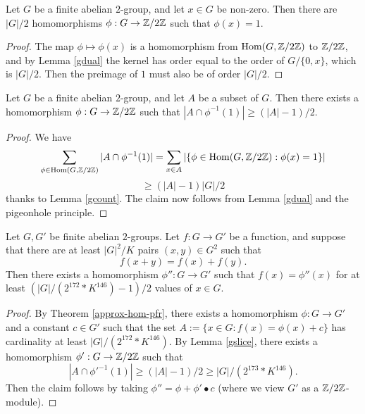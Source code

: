 \begin{lemma}[Counting]\label{gcount}\leanok Let $G$ be a finite abelian $2$-group, and let $x \in G$ be non-zero.  Then there are $|G|/2$ homomorphisms $\phi: G \to \mathbb{Z}/2\mathbb{Z}$ such that $\phi(x) = 1$.
\end{lemma}

\begin{proof} \leanok The map $\phi \mapsto \phi(x)$ is a homomorphism from $\mathrm{Hom}(G,\mathbb{Z}/2\mathbb{Z})$ to $\mathbb{Z}/2\mathbb{Z}$, and by Lemma \ref{gdual} the kernel has order equal to the order of $G / \{0,x\}$, which is $|G|/2$.  Then the preimage of $1$ must also be of order $|G|/2$.
\end{proof}

\begin{lemma}[Slicing]\label{gslice}\leanok  Let $G$ be a finite abelian $2$-group, and let $A$ be a subset of $G$.  Then there exists a homomorphism $\phi: G \to \mathbb{Z}/2\mathbb{Z}$ such that $|A \cap \phi^{-1}(1)| \geq (|A|-1)/2$.
\end{lemma}

\begin{proof}\leanok  We have
  $$ \sum_{\phi \in \mathrm{Hom}(G,\mathbb{Z}/2\mathbb{Z})} |A \cap \phi^{-1}(1)| = \sum_{x \in A} |\{ \phi \in \mathrm{Hom}(G,\mathbb{Z}/2\mathbb{Z}): \phi(x) = 1 \}|$$
  $$ \geq (|A|-1) |G|/2$$
  thanks to Lemma \ref{gcount}. The claim now follows from Lemma \ref{gdual} and the pigeonhole principle.
\end{proof}

\begin{corollary}\label{approx-hom-pfr-no-const}\leanok Let $G,G'$ be finite abelian $2$-groups.
  Let $f: G \to G'$ be a function, and suppose that there are at least $|G|^2 / K$ pairs $(x,y) \in G^2$ such that
$$ f(x+y) = f(x) + f(y).$$
Then there exists a homomorphism $\phi'': G \to G'$
such that $f(x) = \phi''(x)$ for at least $(|G| / (2 ^ {172} * K ^ {146}) - 1)/2$ values of $x \in G$.
\end{corollary}

\begin{proof}\leanok By Theorem \ref{approx-hom-pfr}, there exists a homomorphism $\phi: G \to G'$ and a constant $c \in G'$ such that the set $A := \{ x \in G: f(x) = \phi(x) + c\}$ has cardinality at least $|G| / (2 ^ {172} * K ^ {146})$.  By Lemma \ref{gslice}, there exists a homomorphism $\phi': G \to \mathbb{Z}/2\mathbb{Z}$ such that
$$ |A \cap \phi'^{-1}(1)| \geq (|A|-1)/2 \geq |G| / (2 ^ {173} * K ^ {146}).$$
Then the claim follows by taking $\phi'' = \phi + \phi' \bullet c$ (where we view $G'$ as a $\mathbb{Z}/2\mathbb{Z}$-module).
\end{proof}
